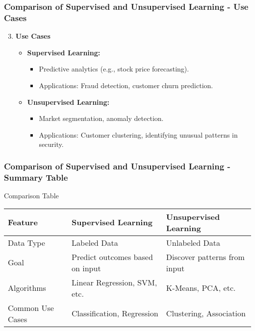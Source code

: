 \documentclass[aspectratio=169]{beamer}
\begin{document}
\begin{frame}[fragile]
    \frametitle{Comparison of Supervised and Unsupervised Learning - Use Cases}
    \begin{enumerate}
        \setcounter{enumi}{2}
        \item \textbf{Use Cases}
        \begin{itemize}
            \item \textbf{Supervised Learning:}
            \begin{itemize}
                \item Predictive analytics (e.g., stock price forecasting).
                \item Applications: Fraud detection, customer churn prediction.
            \end{itemize}
            \item \textbf{Unsupervised Learning:}
            \begin{itemize}
                \item Market segmentation, anomaly detection.
                \item Applications: Customer clustering, identifying unusual patterns in security.
            \end{itemize}
        \end{itemize}
    \end{enumerate}
\end{frame}

\begin{frame}[fragile]
    \frametitle{Comparison of Supervised and Unsupervised Learning - Summary Table}
    \begin{block}{Comparison Table}
    \begin{center}
        \begin{tabular}{|l|l|l|}
            \hline
            \textbf{Feature} & \textbf{Supervised Learning} & \textbf{Unsupervised Learning} \\
            \hline
            Data Type & Labeled Data & Unlabeled Data \\
            \hline
            Goal & Predict outcomes based on input & Discover patterns from input \\
            \hline
            Algorithms & Linear Regression, SVM, etc. & K-Means, PCA, etc. \\
            \hline
            Common Use Cases & Classification, Regression & Clustering, Association \\
            \hline
        \end{tabular}
    \end{center}
    \end{block}
\end{frame}
\end{document}
